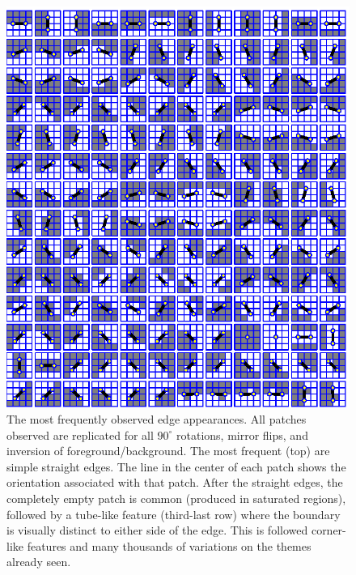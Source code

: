 \ifnote
\begin{figure}[tb]
\begin{center}
\includegraphics[width=\columnwidth]{seen-all}
\caption{
\label{fig:lines-all}
%
The most frequently observed edge appearances.  All patches
observed are replicated for all $90^{\circ}$ rotations, mirror flips,
and inversion of foreground/background.
%
The most frequent (top) are simple straight edges.
%
The line in the center of
each patch shows the orientation associated with that patch.  
%
After the straight edges, the completely empty patch
is common (produced in saturated regions), 
followed by a tube-like feature (third-last row)
where the boundary is visually distinct to either side of
the edge.
This is followed corner-like features and
many thousands of variations on the themes already seen.  
%
}
\end{center}
\end{figure}
\fi
